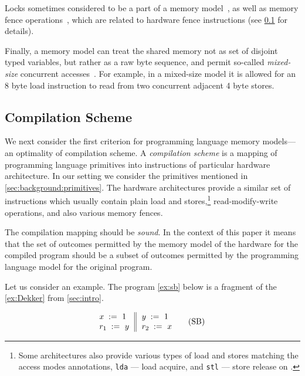 Locks sometimes considered to be a part 
of a memory model~\cite{Manson-al:POPL05}, 
as well as memory fence operations~\cite{Batty-al:POPL11},
which are related to hardware fence instructions
(see \cref{sec:background:compile} for details). 

Finally, a memory model can treat the shared memory 
not as set of disjoint typed variables, but rather as 
a raw byte sequence, and permit so-called \emph{mixed-size} 
concurrent accesses~\cite{Flur-al:POPL17}.
For example, in a mixed-size model it is 
allowed for an 8 byte load instruction 
to read from two concurrent adjacent 4 byte stores. 

\subsection{Compilation Scheme}
\label{sec:background:compile}

We next consider the first criterion for 
programming language memory models---an optimality 
of compilation scheme. 
A \emph{compilation scheme} is a mapping of 
programming language primitives into 
instructions of particular hardware architecture. 
In our setting we consider the primitives 
mentioned in \cref{sec:background:primitives}.
The hardware architectures provide a similar set 
of instructions which usually contain 
plain load and stores,\footnote{Some architectures 
also provide various types of load and stores
matching the access modes annotations, 
\eg \texttt{lda} --- load acquire, 
and \texttt{stl} --- store release on .} 
read-modify-write operations, 
and also various memory fences.    

The compilation mapping should be \emph{sound}.
In the context of this paper it means that 
the set of outcomes permitted by the 
memory model of the hardware 
for the compiled program should be 
a subset of outcomes permitted by the 
programming language model for the original program. 

Let us consider an example. 
The program \ref{ex:sb} below is a 
fragment of the \ref{ex:Dekker} from \cref{sec:intro}.

\begin{equation*}
\inarrII{
   \writeInst{}{x}{1}   \\
   \readInst{}{r_1}{y}  \\
}{
  \writeInst{}{y}{1}   \\
  \readInst{}{r_2}{x}  \\
}
\tag{SB}\label{ex:sb}
\end{equation*}

